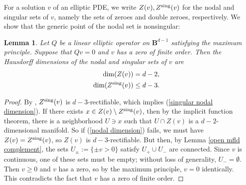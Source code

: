 \documentclass[reqno,11pt]{amsart}
\newcommand{\Ball}{\mathbf{B}}
\newtheorem{lemma}[theorem]{Lemma}
\theoremstyle{definition}
\numberwithin{equation}{section}
\begin{document}
For a solution $v$ of an elliptic PDE, we write $Z(v), Z^{\rm sing}(v)$ for the nodal and singular sets of $v$, namely the sets of zeroes and double zeroes, respectively.
We show that the generic point of the nodal set is nonsingular:

\begin{lemma}\label{nodal set is generically smooth}
Let $Q$ be a linear elliptic operator on $\Ball^{d - 1}$ satisfying the maximum principle.
Suppose that $Qv = 0$ and $v$ has a zero of finite order.
Then the Hausdorff dimensions of the nodal and singular sets of $v$ are
\begin{align}
	\dim(Z(v)) &= d - 2, \label{nodal dimension}\\
	\dim(Z^{\rm sing}(v)) &\leq d - 3. \label{singular nodal dimension}
\end{align}
\end{lemma}
\begin{proof}
By \cite[Lemma 1.9]{Hardt89}, $Z^{\rm sing}(v)$ is $d - 3$-rectifiable, which implies (\ref{singular nodal dimension}).
If there exists $x \in Z(v) \setminus Z^{\rm sing}(v)$, then by the implicit function theorem, there is a neighborhood $U \ni x$ such that $U \cap Z(v)$ is a $d - 2$-dimensional manifold.
So if (\ref{nodal dimension}) fails, we must have $Z(v) = Z^{\rm sing}(v)$, so $Z(v)$ is $d - 3$-rectifiable.
But then, by Lemma \ref{open mfld complement}, the sets $U_\pm := \{\pm v > 0\}$ satisfy $U_+ \cup U_-$ are connected.
Since $v$ is continuous, one of these sets must be empty; without loss of generality, $U_- = \emptyset$.
Then $v \geq 0$ and $v$ has a zero, so by the maximum principle, $v = 0$ identically.
This contradicts the fact that $v$ has a zero of finite order.
\end{proof}
\end{document}
